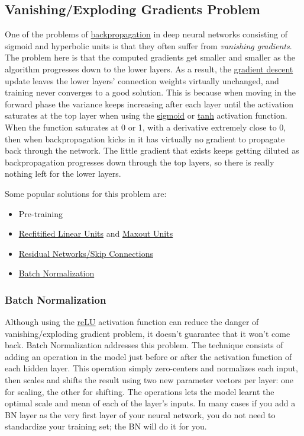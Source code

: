 \documentclass[12pt]{article}
\begin{document}
    \subsection{Vanishing/Exploding Gradients Problem} \label{sec:VanishingProblem}
        One of the problems of \hyperref[sec:Backprop]{backpropagation} in deep neural networks consisting of sigmoid
        and hyperbolic units is that they often suffer from \textit{vanishing gradients}. The problem here is that the
        computed gradients get smaller and smaller as the algorithm progresses down to the lower layers. As a result,
        the \hyperref[sec:GD]{gradient descent} update leaves the lower layers' connection weights virtually unchanged,
        and training never converges to a good solution. This is because when moving in the forward phase the
        variance keeps increasing after each layer until the activation saturates at the top layer when using the
        \hyperref[sec:Sigmoid]{sigmoid} or \hyperref[sec:Tanh]{tanh} activation function. When the function
        saturates at 0 or 1, with a derivative extremely close to 0, then when backpropagation kicks in it has
        virtually no gradient to propagate back through the network. The little gradient that exists keeps getting
        diluted as backpropagation progresses down through the top layers, so there is really nothing left for the
        lower layers.
        
        Some popular solutions for this problem are:
        \begin{itemize}
            \item Pre-training
            \item \hyperref[sec:reLU]{Recfitified Linear Units} and \hyperref[sec:MaxoutUnits]{Maxout Units}
            \item \hyperref[sec:ResNet]{Residual Networks/Skip Connections}
            \item \hyperref[sec:BatchNormalization]{Batch Normalization}
        \end{itemize}

        \subsubsection{Batch Normalization} \label{sec:BatchNormalization}
            Although using the \hyperref[sec:reLU]{reLU} activation function can reduce the danger of
            vanishing/exploding gradient problem, it doesn't guarantee that it won't come back. Batch Normalization
            addresses this problem. The technique consists of adding an operation in the model just before or after the
            activation function of each hidden layer. This operation simply zero-centers and normalizes each input, then
            scales and shifts the result using two new parameter vectors per layer: one for scaling, the other for
            shifting. The operations lets the model learnt the optimal scale and mean of each of the layer's inputs. In
            many cases if you add a BN layer as the very first layer of your neural network, you do not need to
            standardize your training set; the BN will do it for you. 
\end{document}
